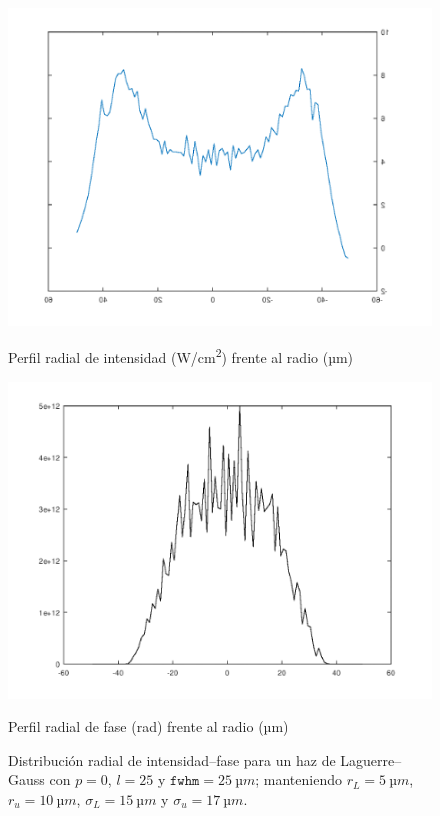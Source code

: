 \begin{figure}[htbp!]
  \centering
  \begin{subcaptionblock}{.4\textwidth}
    \centering
    \includegraphics[width=\textwidth]{Figuras/anx_oamfs_1.png}
    \caption*{Perfil radial de intensidad (\unit{W/cm^2}) frente al radio (\unit{µm})}
  \end{subcaptionblock}
  \begin{subcaptionblock}{.4\textwidth}
    \centering
    \includegraphics[width=\textwidth]{Figuras/anx_oamint_1.png}
    \caption*{Perfil radial de fase (\unit{rad}) frente al radio (\unit{µm})}
  \end{subcaptionblock}
   \caption*{Distribución radial de intensidad--fase para un haz de Laguerre--Gauss con $p=0$, $l=25$ y $\texttt{fwhm}=\qty{25}{µm}$; manteniendo $r_{L}=\qty{5}{µm}$, $r_{u}=\qty{10}{µm}$, $\sigma_{L}=\qty{15}{µm}$ y $\sigma_{u}=\qty{17}{µm}$.}
\end{figure}

